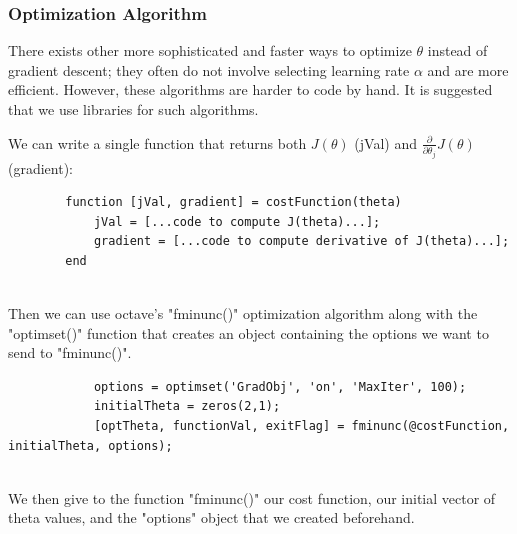         \subsubsection{Optimization Algorithm}
        There exists other more sophisticated and faster ways to optimize $\theta$ instead of gradient descent; they often do not involve selecting learning rate $\alpha$ and are more efficient. However, these algorithms are harder to code by hand. It is suggested that we use libraries for such algorithms. 

        We can write a single function that returns both  $J(\theta)$ (jVal) and  $\frac{\partial}{\partial \theta_j}J(\theta)$ (gradient):

        \begin{lstlisting}
        function [jVal, gradient] = costFunction(theta)
            jVal = [...code to compute J(theta)...];
            gradient = [...code to compute derivative of J(theta)...];
        end
            
        \end{lstlisting}

        Then we can use octave's "fminunc()" optimization algorithm along with the "optimset()" function that creates an object containing the options we want to send to "fminunc()".

        \begin{lstlisting}
            options = optimset('GradObj', 'on', 'MaxIter', 100);
            initialTheta = zeros(2,1);
            [optTheta, functionVal, exitFlag] = fminunc(@costFunction, initialTheta, options);
            
        \end{lstlisting}
        

        We then give to the function "fminunc()" our cost function, our initial vector of theta values, and the "options" object that we created beforehand.
